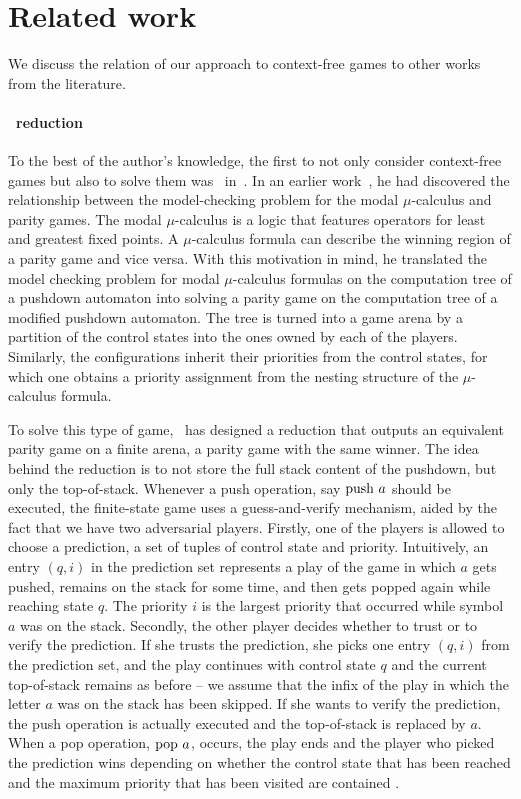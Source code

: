 \documentclass[../../diss.tex]{subfiles}
\begin{document}
\section{Related work}%
\label{Section:CFGamesRelWork}%

We discuss the relation of our approach to context-free games to other works from the literature.

\paragraph{\Walus~reduction}

To the best of the author's knowledge, the first to not only consider context-free games but also to solve them was \Walu~in~\cite{Walukiewicz01}.
In an earlier work~\cite{Walukiewicz02}, he had discovered the relationship between the model-checking problem for the modal $\mu$-calculus and parity games.
The modal $\mu$-calculus is a logic that features operators for least and greatest fixed points.
A $\mu$-calculus formula can describe the winning region of a parity game and vice versa.
With this motivation in mind, he translated the model checking problem for modal $\mu$-calculus formulas on the computation tree of a pushdown automaton into solving a parity game on the computation tree of a modified pushdown automaton.
The tree is turned into a game arena by a partition of the control states into the ones owned by each of the players.
Similarly, the configurations inherit their priorities from the control states, for which one obtains a priority assignment from the nesting structure of the $\mu$-calculus formula.

To solve this type of game, \Walu~has designed a reduction that outputs an equivalent parity game on a finite arena, \ie a parity game with the same winner.
The idea behind the reduction is to not store the full stack content of the pushdown, but only the top-of-stack.
Whenever a push operation, say $\text{push}~ a$ should be executed, the finite-state game uses a guess-and-verify mechanism, aided by the fact that we have two adversarial players.
Firstly, one of the players is allowed to choose a prediction, a set of tuples of control state and priority.
Intuitively, an entry $(q,i)$ in the prediction set represents a play of the game in which $a$ gets pushed, remains on the stack for some time, and then gets popped again while reaching state $q$.
The priority $i$ is the largest priority that occurred while symbol $a$ was on the stack.
Secondly, the other player decides whether to trust or to verify the prediction.
If she trusts the prediction, she picks one entry $(q,i)$ from the prediction set, and the play continues with control state $q$ and the current top-of-stack remains as before -- we assume that the infix of the play in which the letter $a$ was on the stack has been skipped.
If she wants to verify the prediction, the push operation is actually executed and the top-of-stack is replaced by $a$.
When a pop operation, $\text{pop}~ a$, occurs, the play ends and the player who picked the prediction wins depending on whether the control state that has been reached and the maximum priority that has been visited are contained .
\end{document}
